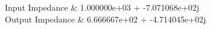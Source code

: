 Input Impedance & 1.000000e+03 + -7.071068e+02j \\ \hline
Output Impedance & 6.666667e+02 + -4.714045e+02j\\ \hline
